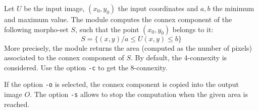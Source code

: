 Let $U$ be the input image, $(x_0,y_0)$ the input coordinates and
$a,b$ the minimum and maximum value.
The module computes the connex component of the following morpho-set $S$, such
that the point $(x_0,y_0)$ belongs to it:
\[
S = \{ (x,y) / a \leq U(x,y) \leq b \}
\]
More precisely, the module returns the area (computed as the number of pixels)
associated to the connex component of $S$.
By default, the 4-connexity is considered. Use the option  \verb+-c+ 
to get the 8-connexity.

If the option \verb+-o+ is selected, the connex component is copied into
the output image $O$.
The option \verb+-s+ allows to stop the computation when the given area
is reached.
